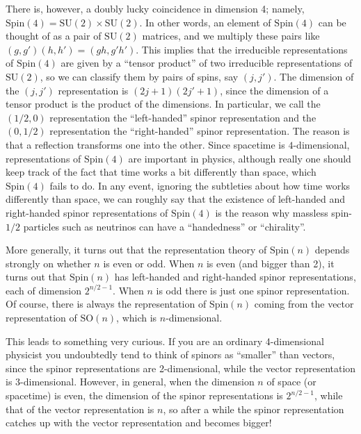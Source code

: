 \documentclass{article}
\begin{document}
There is, however, a doubly lucky coincidence in dimension 4; namely,
\(\mathrm{Spin}(4) = \mathrm{SU}(2) \times \mathrm{SU}(2)\). In other
words, an element of \(\mathrm{Spin}(4)\) can be thought of as a pair of
\(\mathrm{SU}(2)\) matrices, and we multiply these pairs like
\((g,g')(h,h') = (gh,g'h')\). This implies that the irreducible
representations of \(\mathrm{Spin}(4)\) are given by a ``tensor
product'' of two irreducible representations of \(\mathrm{SU}(2)\), so
we can classify them by pairs of spins, say \((j,j')\). The dimension of
the \((j,j')\) representation is \((2j+1)(2j'+1)\), since the dimension
of a tensor product is the product of the dimensions. In particular, we
call the \((1/2,0)\) representation the ``left-handed'' spinor
representation and the \((0,1/2)\) representation the ``right-handed''
spinor representation. The reason is that a reflection transforms one
into the other. Since spacetime is \(4\)-dimensional, representations of
\(\mathrm{Spin}(4)\) are important in physics, although really one
should keep track of the fact that time works a bit differently than
space, which \(\mathrm{Spin}(4)\) fails to do. In any event, ignoring
the subtleties about how time works differently than space, we can
roughly say that the existence of left-handed and right-handed spinor
representations of \(\mathrm{Spin}(4)\) is the reason why massless
spin-\(1/2\) particles such as neutrinos can have a ``handedness'' or
``chirality''.

More generally, it turns out that the representation theory of
\(\mathrm{Spin}(n)\) depends strongly on whether \(n\) is even or odd.
When \(n\) is even (and bigger than 2), it turns out that
\(\mathrm{Spin}(n)\) has left-handed and right-handed spinor
representations, each of dimension \(2^{n/2-1}\). When \(n\) is odd
there is just one spinor representation. Of course, there is always the
representation of \(\mathrm{Spin}(n)\) coming from the vector
representation of \(\mathrm{SO}(n)\), which is \(n\)-dimensional.

This leads to something very curious. If you are an ordinary
4-dimensional physicist you undoubtedly tend to think of spinors as
``smaller'' than vectors, since the spinor representations are
2-dimensional, while the vector representation is \(3\)-dimensional.
However, in general, when the dimension \(n\) of space (or spacetime) is
even, the dimension of the spinor representations is \(2^{n/2-1}\),
while that of the vector representation is \(n\), so after a while the
spinor representation catches up with the vector representation and
becomes bigger!
\end{document}
